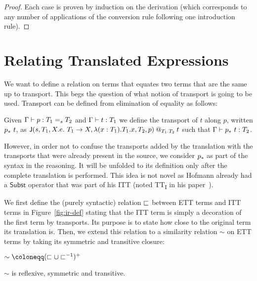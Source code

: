 \begin{proof}
  Each case is proven by induction on the derivation
  (which corresponds to any number of applications of the conversion rule
  following one introduction rule).
\end{proof}

\section{Relating Translated Expressions}
\label{sec:relation}

We want to define a relation on terms that equates two terms that are
the same up to transport.
%
This begs the question of what notion of transport is going to be
used.
%
Transport can be defined from elimination of equality as follows:
%
\begin{definition}[Transport]
  Given $\isterm{\Ga}{p}{\Eq{s}{T_1}{T_2}}$ and
  $\isterm{\Ga}{t}{T_1}$ we define the transport of $t$ along $p$, written
  $\transpo{p}\ t$, as
  $\app
    {\J
      {s}
      {T_1}
      {X.e.\ T_1 \to X}
      {\lam{x:T_1}{T_1} x}
      {T_2}
      {p}
    }
    {T_1}
    {T_2}
    {t}
  $ such that $\isterm{\Ga}{\transpo{p}\ t}{T_2}$.
\end{definition}
%
However, in order not to confuse the transports added by the
translation with the transports that were already present in the
source, we consider $\transpo{p}$ as part of the syntax in the
reasoning. It will be unfolded to its definition only after the
complete translation is performed.
%
This idea is not novel as Hofmann already had a $\mathsf{Subst}$ operator that
was part of his ITT (noted TT\textsubscript{I} in his
paper~).

%
We first define the (purely syntactic) relation $\ir$ between ETT terms
and ITT terms in Figure~\ref{fig:ir-def} stating that the ITT term is
simply a decoration of the first term by transports. Its purpose is to
state how close to the original term its translation is. Then, we extend
this relation to a similarity relation $\sim$ on ETT terms by taking its
symmetric and transitive closure:
\begin{center}$\sim \coloneqq (\ir \cup \ir^{-1})^+$
\end{center}

\begin{lemma}
  \label{lem:sim-er}
  $\sim$ is reflexive, symmetric and transitive.
\end{lemma}

